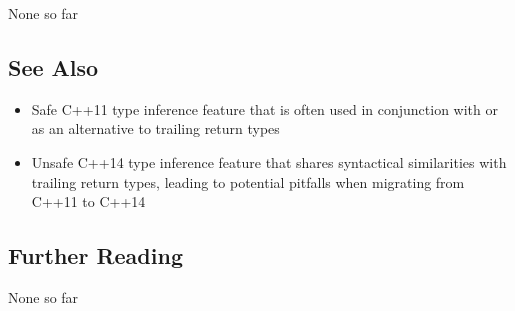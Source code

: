 None so far

\subsection[See Also]{See Also}\label{see-also}

\begin{itemize}
\item{%
Safe C++11 type inference feature that is often used in conjunction with or as an alternative to trailing return types}
\item{%
Unsafe C++14 type inference feature that shares syntactical similarities with trailing return types, leading to potential pitfalls when migrating from C++11 to C++14}
\end{itemize}

\subsection[Further Reading]{Further Reading}\label{further-reading}

None so far


